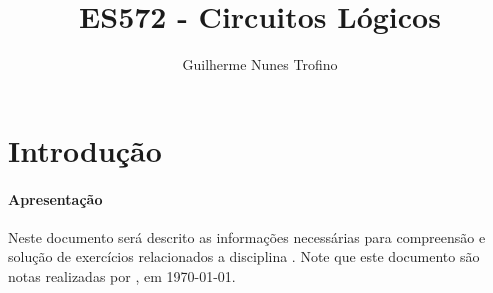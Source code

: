 \documentclass{article}
\title{ES572 - Circuitos Lógicos}
\author{Guilherme Nunes Trofino}
\begin{document}
    \maketitle
\newpage

    \tableofcontents
\newpage

    \section{Introdução}
        \paragraph{Apresentação}Neste documento será descrito as informações necessárias para compreensão e solução de exercícios relacionados a disciplina \thetitle . Note que este documento são notas realizadas por \theauthor , em \today.
\end{document}
